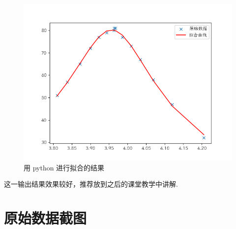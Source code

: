 \documentclass{THUexprep}
\begin{document}
\begin{figure}[h]
    \centering
    \includegraphics[scale=0.5]{python.png}
    \caption{用 python 进行拟合的结果}
    \label{fig:python}
\end{figure}

这一输出结果效果较好，推荐放到之后的课堂教学中讲解.
\newpage

\section{原始数据截图}
\end{document}
